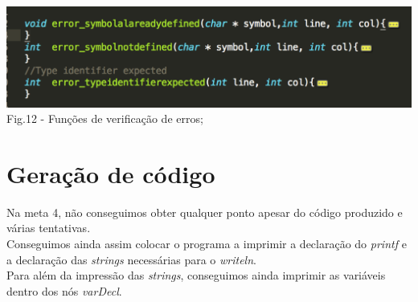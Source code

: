 \documentclass[12pt]{article}
\begin{document}
\begin{center}
\includegraphics[scale=0.9]{errors.png}\\
Fig.12 - Funções de verificação de erros;
\end{center}

\newpage

\section{Geração de código}

\indent Na meta 4, não conseguimos obter qualquer ponto apesar do código produzido e várias tentativas.\\
\indent Conseguimos ainda assim colocar o programa a imprimir a declaração do \textit{printf} e a declaração das \textit{strings} necessárias para o \textit{writeln}.\\
\indent Para além da impressão das \textit{strings}, conseguimos ainda imprimir as variáveis dentro dos nós \textit{varDecl}.
\end{document}
